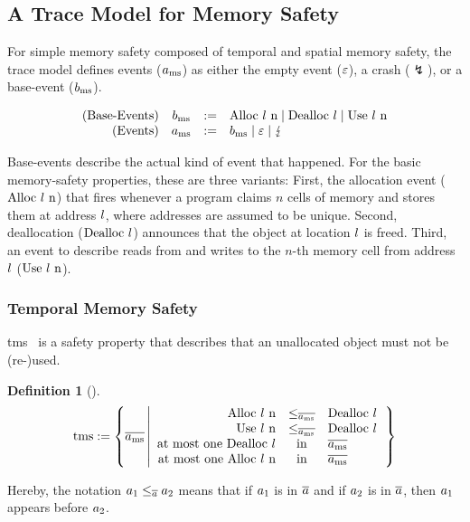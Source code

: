 \documentclass[acmsmall]{acmart}
\theoremstyle{definition}
\newtheorem{definition}{Definition}[section]
\begin{document}
\subsection{A Trace Model for Memory Safety}\label{subsec:basic:memsafety:tracemodel}

For simple memory safety composed of temporal and spatial memory safety, the trace model defines events ($\event[_{\mssafe}]$) as either the empty event ($\emptyevent$), a crash ($\lightning$), or a base-event ($\preevent[_{\mssafe}]$).

\vspace{-1.0em}
\[
  \begin{array}{rcll}
    \text{(Base-Events)}&\preevent[_{\mssafe}] &:=& \ev{Alloc \loc\ n} \mid \ev{Dealloc \loc} \mid \ev{Use \loc\ n} \\
    \text{(Events)}&\event[_{\mssafe}] &:=& \preevent[_{\mssafe}] \mid \emptyevent \mid \lightning \\ 
  \end{array}
\]

Base-events describe the actual kind of event that happened.
For the basic memory-safety properties, these are three variants:
First, the allocation event ($\ev{Alloc\ \loc\ n}$) that fires whenever a program claims $n$ cells of memory and stores them at address $\loc$, where addresses are assumed to be unique.
Second, deallocation ($\ev{Dealloc\ \loc}$) announces that the object at location $\loc$ is freed.
Third, an event to describe reads from and writes to the $n$-th memory cell from address $\loc$ ($\ev{Use\ \loc\ n}$).

\subsubsection{Temporal Memory Safety}

\gls*{tms}~\cite{nagarakatte2010cets} is a safety property that describes that an unallocated object must not be (re-)used.

\begin{definition}[]\label{def:trace:tmsdef}
  $$
  \tmssafe:=\left\{\trace[_{\mssafe}] \left| \begin{array}{rcl}
    \ev{Alloc\ \loc\ n}&\le_{\trace[_{\mssafe}]}&\ev{Dealloc\ \loc} \\
    \ev{Use\ \loc\ n}&\le_{\trace[_{\mssafe}]}&\ev{Dealloc\ \loc} \\
    \text{at most one }\ev{Dealloc\ \loc}&\text{in}&\trace[_{\mssafe}] \\
    \text{at most one }\ev{Alloc\ \loc\ n}&\text{in}&\trace[_{\mssafe}] \\
  \end{array}\right.\right\}
  $$
\end{definition}
Hereby, the notation $\event[_{1}]\le_{\trace}\event[_{2}]$ means that if $\event[_{1}]$ is in $\trace$ and if $\event[_{2}]$ is in $\trace$, then $\event[_{1}]$ appears before $\event[_{2}]$.
\end{document}

